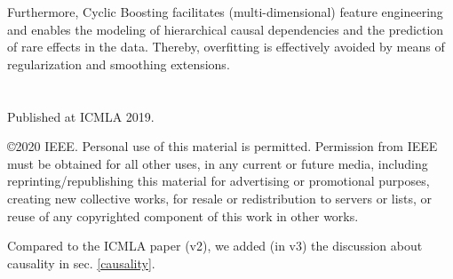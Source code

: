\documentclass[BCOR=1mm, DIV=calc,10pt,
twoside=true,
twocolumn,
headings=normal]{scrartcl}
\begin{document}
Furthermore, Cyclic Boosting facilitates (multi-dimensional) feature engineering and
enables the modeling of hierarchical causal dependencies and the prediction of rare
effects in the data. Thereby, overfitting is effectively avoided by means of
regularization and smoothing extensions.


\section*{}
Published at ICMLA 2019.

\noindent
\copyright 2020 IEEE. Personal use of this material is permitted. Permission from IEEE must be obtained for all other uses, in any current or future media, including reprinting/republishing this material for advertising or promotional purposes, creating new collective works, for resale or redistribution to servers or lists, or reuse of any copyrighted component of this work in other works. 

\noindent
Compared to the ICMLA paper (v2), we added (in v3) the discussion about causality in sec. \ref{causality}.




\end{document}
